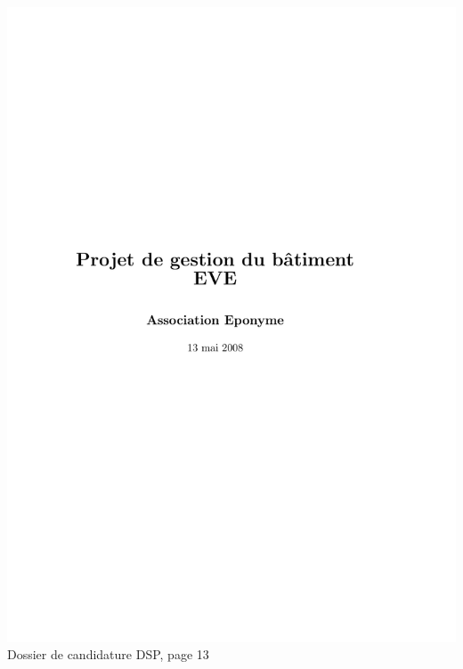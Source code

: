 \includegraphics[scale=0.85,trim=20mm 20mm 20mm 20mm,clip,page=13]{annexes/candidature_dsp.pdf} \\
Dossier de candidature DSP, page 13
\newpage
